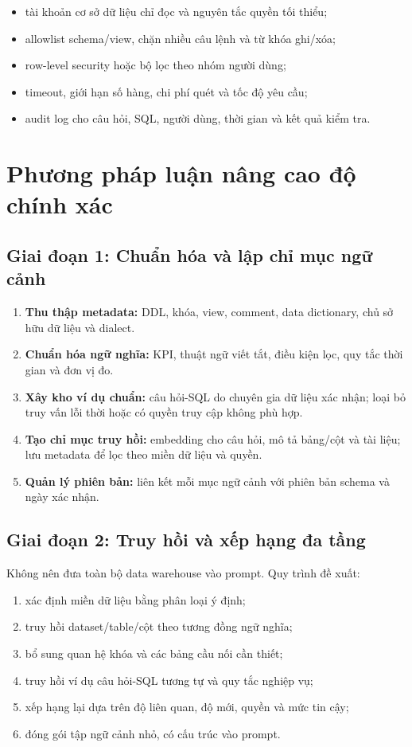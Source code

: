 \documentclass[12pt,a4paper]{article}
\begin{document}
\begin{itemize}
  \item tài khoản cơ sở dữ liệu chỉ đọc và nguyên tắc quyền tối thiểu;
  \item allowlist schema/view, chặn nhiều câu lệnh và từ khóa ghi/xóa;
  \item row-level security hoặc bộ lọc theo nhóm người dùng;
  \item timeout, giới hạn số hàng, chi phí quét và tốc độ yêu cầu;
  \item audit log cho câu hỏi, SQL, người dùng, thời gian và kết quả kiểm tra.
\end{itemize}

\section{Phương pháp luận nâng cao độ chính xác}

\subsection{Giai đoạn 1: Chuẩn hóa và lập chỉ mục ngữ cảnh}

\begin{enumerate}
  \item \textbf{Thu thập metadata:} DDL, khóa, view, comment, data dictionary,
  chủ sở hữu dữ liệu và dialect.
  \item \textbf{Chuẩn hóa ngữ nghĩa:} KPI, thuật ngữ viết tắt, điều kiện lọc,
  quy tắc thời gian và đơn vị đo.
  \item \textbf{Xây kho ví dụ chuẩn:} câu hỏi-SQL do chuyên gia dữ liệu xác
  nhận; loại bỏ truy vấn lỗi thời hoặc có quyền truy cập không phù hợp.
  \item \textbf{Tạo chỉ mục truy hồi:} embedding cho câu hỏi, mô tả bảng/cột
  và tài liệu; lưu metadata để lọc theo miền dữ liệu và quyền.
  \item \textbf{Quản lý phiên bản:} liên kết mỗi mục ngữ cảnh với phiên bản
  schema và ngày xác nhận.
\end{enumerate}

\subsection{Giai đoạn 2: Truy hồi và xếp hạng đa tầng}

Không nên đưa toàn bộ data warehouse vào prompt. Quy trình đề xuất:

\begin{enumerate}
  \item xác định miền dữ liệu bằng phân loại ý định;
  \item truy hồi dataset/table/cột theo tương đồng ngữ nghĩa;
  \item bổ sung quan hệ khóa và các bảng cầu nối cần thiết;
  \item truy hồi ví dụ câu hỏi-SQL tương tự và quy tắc nghiệp vụ;
  \item xếp hạng lại dựa trên độ liên quan, độ mới, quyền và mức tin cậy;
  \item đóng gói tập ngữ cảnh nhỏ, có cấu trúc vào prompt.
\end{enumerate}
\end{document}
